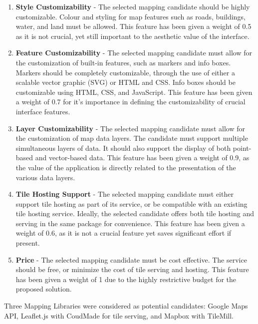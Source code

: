 \documentclass{report}
\begin{document}
\begin{enumerate}

\item \textbf{Style Customizability} - The selected mapping candidate should be highly customizable. Colour and styling for map features such as roads, buildings, water, and land must be allowed. This feature has been given a weight of 0.5 as it is not crucial, yet still important to the aesthetic value of the interface.

\item \textbf{Feature Customizability} - The selected mapping candidate must allow for the customization of built-in features, such as markers and info boxes. Markers should be completely customizable, through the use of either a scalable vector graphic (SVG) or HTML and CSS. Info boxes should be customizable using HTML, CSS, and JavaScript. This feature has been given a weight of 0.7 for it's importance in defining the customizability of crucial interface features.

\item \textbf{Layer Customizability} - The selected mapping candidate must allow for the customization of map data layers. The candidate must support multiple simultaneous layers of data. It should also support the display of both point-based and vector-based data. This feature has been given a weight of 0.9, as the value of the application is directly related to the presentation of the various data layers.

\item \textbf{Tile Hosting Support} - The selected mapping candidate must either support tile hosting as part of its service, or be compatible with an existing tile hosting service. Ideally, the selected candidate offers both tile hosting and serving in the same package for convenience. This feature has been given a weight of 0.6, as it is not a crucial feature yet saves significant effort if present.

\item \textbf{Price} - The selected mapping candidate must be cost effective. The service should be free, or minimize the cost of tile serving and hosting. This feature has been given a weight of 1 due to the highly restrictive budget for the proposed solution.

\end{enumerate}

Three Mapping Libraries were considered as potential candidates: Google Maps API, Leaflet.js with CoudMade for tile serving, and Mapbox with TileMill.
\end{document}
